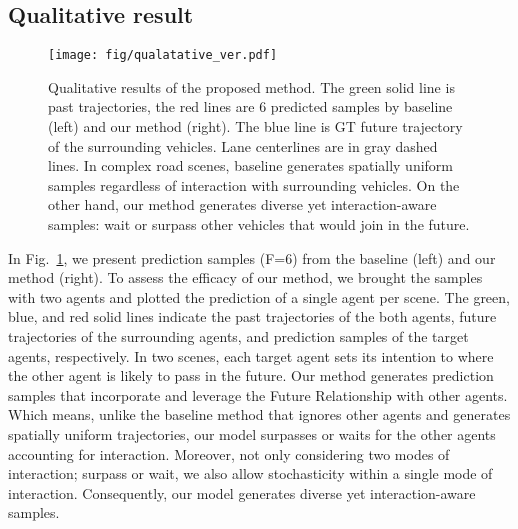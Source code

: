 \documentclass{article} \usepackage{iclr2023_conference,times}
\begin{document}
\subsection{Qualitative result}
\label{sec:qualitative_result}
\begin{figure}
  \centering
  \hspace*{-0.0\linewidth}\texttt{[image: fig/qualatative\_ver.pdf]}
\caption{Qualitative results of the proposed method. The green solid line is past trajectories, the red lines are 6 predicted samples by baseline (left) and our method (right). The blue line is GT future trajectory of the surrounding vehicles. Lane centerlines are in gray dashed lines. In complex road scenes, baseline generates spatially uniform samples regardless of interaction with surrounding vehicles. On the other hand, our method generates diverse yet interaction-aware samples: wait or surpass other vehicles that would join in the future.}  
  \label{fig:qualatative}
  \vspace{-5pt}
\end{figure}
In Fig.~\ref{fig:qualatative}, we present prediction samples (F=6) from the baseline (left) and our method (right).
To assess the efficacy of our method, we brought the samples with two agents and plotted the prediction of a single agent per scene.
The green, blue, and red solid lines indicate the past trajectories of the both agents, future trajectories of the surrounding agents, and prediction samples of the target agents, respectively.
In two scenes, each target agent sets its intention to where the other agent is likely to pass in the future.
Our method generates prediction samples that incorporate and leverage the Future Relationship with other agents.
Which means, unlike the baseline method that ignores other agents and generates spatially uniform trajectories, our model surpasses or waits for the other agents accounting for interaction.
Moreover, not only considering two modes of interaction; surpass or wait, we also allow stochasticity within a single mode of interaction.
Consequently, our model generates diverse yet interaction-aware samples.
\end{document}
